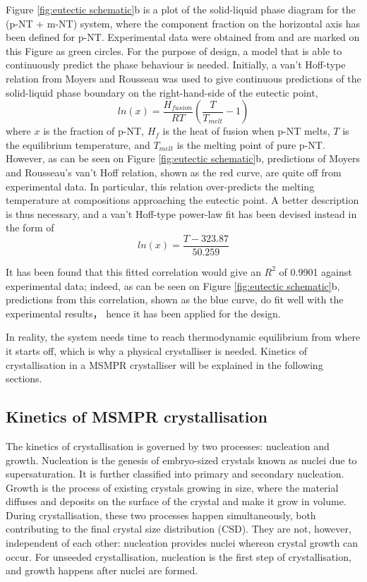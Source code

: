 Figure \ref{fig:eutectic schematic}b is a plot of the solid-liquid phase diagram for the (p-NT + m-NT) system, where the component fraction on the horizontal axis has been defined for p-NT. Experimental data were obtained from \cite{noauthor_detherm_2021} and are marked on this Figure as green circles. For the purpose of design, a model that is able to continuously predict the phase behaviour is needed. Initially, a van't Hoff-type relation from Moyers and Rousseau was used to give continuous predictions of the solid-liquid phase boundary on the right-hand-side of the eutectic point, \cite{moyers_crystallization_1987}
\begin{equation}
    ln(x) = \frac{H_{fusion}}{R T}(\frac{T}{T_{melt}} - 1)
\end{equation}
where $x$ is the fraction of p-NT, $H_f$ is the heat of fusion when p-NT melts, $T$ is the equilibrium temperature, and $T_{melt}$ is the melting point of pure p-NT. However, as can be seen on Figure \ref{fig:eutectic schematic}b, predictions of Moyers and Rousseau's van't Hoff relation, shown as the red curve, are quite off from experimental data. In particular, this relation over-predicts the melting temperature at compositions approaching the eutectic point. A better description is thus necessary, and a van't Hoff-type power-law fit has been devised instead in the form of 
\begin{equation}
     ln(x) = \frac{T - 323.87}{50.259}
\end{equation}

It has been found that this fitted correlation would give an $R^2$ of 0.9901 against experimental data; indeed, as can be seen on Figure \ref{fig:eutectic schematic}b, predictions from this correlation, shown as the blue curve, do fit well with the experimental results， hence it has been applied for the design.

In reality, the system needs time to reach thermodynamic equilibrium from where it starts off, which is why a physical crystalliser is needed. Kinetics of crystallisation in a MSMPR crystalliser will be explained in the following sections.

\subsection{Kinetics of MSMPR crystallisation}
The kinetics of crystallisation is governed by two processes: nucleation and growth. Nucleation is the genesis of embryo-sized crystals known as nuclei due to supersaturation. \cite{richardson_chemical_nodate} It is further classified into primary and secondary nucleation. Growth is the process of existing crystals growing in size, where the material diffuses and deposits on the surface of the crystal and make it grow in volume. During crystallisation, these two processes happen simultaneously, both contributing to the final crystal size distribution (CSD). \cite{richardson_chemical_nodate} They are not, however, independent of each other: nucleation provides nuclei whereon crystal growth can occur. For unseeded crystallisation, nucleation is the first step of crystallisation, and growth happens after nuclei are formed. \cite{mullin}

